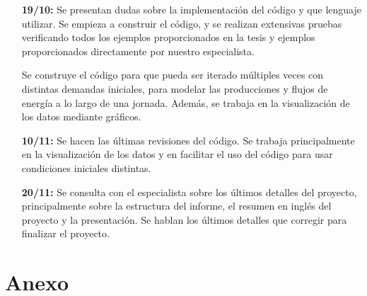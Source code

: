 \documentclass[12pt,twoside]{article}
\begin{document}
\begin{enumerate}
		\item [\textbf{19/10:}] Se presentan dudas sobre la implementaci\'on del c\'odigo y que lenguaje utilizar. Se empieza a construir el c\'odigo, y se realizan extensivas pruebas verificando todos los ejemplos proporcionados en la tesis y ejemplos proporcionados directamente por nuestro especialista.
		
		Se construye el c\'odigo para que pueda ser iterado m\'ultiples veces con distintas demandas iniciales, para modelar las producciones y flujos de energ\'ia a lo largo de una jornada. Adem\'as, se trabaja en la visualizaci\'on de los datos mediante gr\'aficos.
		
		\item[\textbf{10/11:}] Se hacen las \'ultimas revisiones del c\'odigo. Se trabaja principalmente en la visualizaci\'on de los datos y en facilitar el uso del c\'odigo para usar condiciones iniciales distintas. 
		
		\item[\textbf{20/11:}] Se consulta con el especialista sobre los \'ultimos detalles del proyecto, principalmente sobre la estructura del informe, el resumen en ingl\'es del proyecto y la presentaci\'on. Se hablan los \'ultimos detalles que corregir para finalizar el proyecto.
	\end{enumerate}
	
	\newpage
	\section{Anexo}
	
\end{document}

